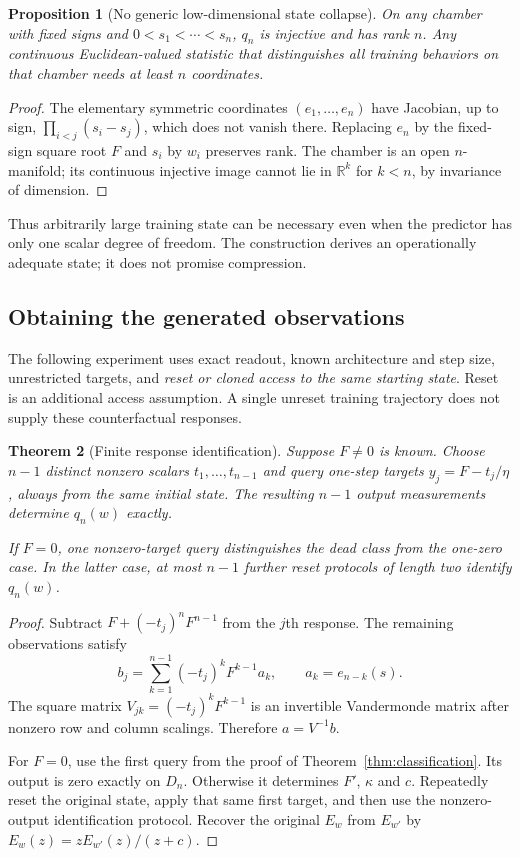 \documentclass[11pt]{article}
\newtheorem{theorem}{Theorem}[section]
\newtheorem{proposition}[theorem]{Proposition}
\theoremstyle{definition}\newtheorem{definition}[theorem]{Definition}
\theoremstyle{remark}\newtheorem{remark}[theorem]{Remark}
\newcommand{\R}{\mathbb R}
\begin{document}
\begin{proposition}[No generic low-dimensional state collapse]
On any chamber with fixed signs and $0<s_1<\cdots<s_n$, $q_n$ is injective and has rank $n$. Any continuous Euclidean-valued statistic that distinguishes all training behaviors on that chamber needs at least $n$ coordinates.
\end{proposition}
\begin{proof}
The elementary symmetric coordinates $(e_1,\ldots,e_n)$ have Jacobian, up to sign, $\prod_{i<j}(s_i-s_j)$, which does not vanish there. Replacing $e_n$ by the fixed-sign square root $F$ and $s_i$ by $w_i$ preserves rank. The chamber is an open $n$-manifold; its continuous injective image cannot lie in $\R^k$ for $k<n$, by invariance of dimension.
\end{proof}
Thus arbitrarily large training state can be necessary even when the predictor has only one scalar degree of freedom. The construction derives an operationally adequate state; it does not promise compression.

\subsection{Obtaining the generated observations}
The following experiment uses exact readout, known architecture and step size, unrestricted targets, and \emph{reset or cloned access to the same starting state}. Reset is an additional access assumption. A single unreset training trajectory does not supply these counterfactual responses.

\begin{theorem}[Finite response identification]\label{thm:identify}
Suppose $F\ne0$ is known. Choose $n-1$ distinct nonzero scalars $t_1,\ldots,t_{n-1}$ and query one-step targets $y_j=F-t_j/\eta$, always from the same initial state. The resulting $n-1$ output measurements determine $q_n(w)$ exactly.

If $F=0$, one nonzero-target query distinguishes the dead class from the one-zero case. In the latter case, at most $n-1$ further reset protocols of length two identify $q_n(w)$.
\end{theorem}
\begin{proof}
Subtract $F+(-t_j)^nF^{n-1}$ from the $j$th response. The remaining observations satisfy
\[
 b_j=\sum_{k=1}^{n-1}(-t_j)^kF^{k-1}a_k,
 \qquad a_k=e_{n-k}(s).
\]
The square matrix $V_{jk}=(-t_j)^kF^{k-1}$ is an invertible Vandermonde matrix after nonzero row and column scalings. Therefore $a=V^{-1}b$.

For $F=0$, use the first query from the proof of Theorem~\ref{thm:classification}. Its output is zero exactly on $D_n$. Otherwise it determines $F'$, $\kappa$ and $c$. Repeatedly reset the original state, apply that same first target, and then use the nonzero-output identification protocol. Recover the original $E_w$ from $E_{w'}$ by $E_w(z)=zE_{w'}(z)/(z+c)$.
\end{proof}
\end{document}
